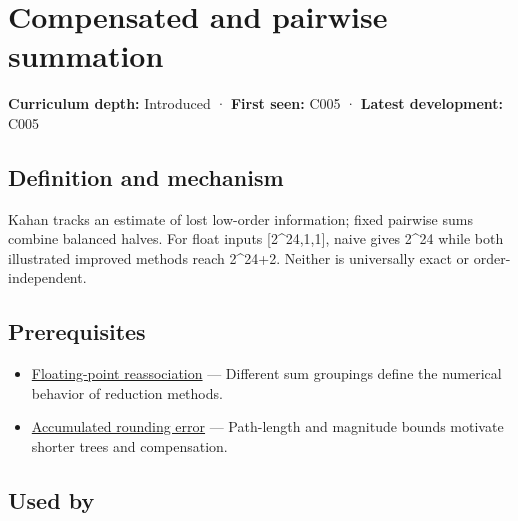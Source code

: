 \hypertarget{appendix-df318da57389}{}\label{referencestart:appendix-df318da57389}
\section{Compensated and pairwise summation}\label{appendix-df318da57389-compensated-and-pairwise-summation}

\hypertarget{appendix-df318da57389-compensated-and-pairwise-summation}{}

\textbf{Curriculum depth:} Introduced · \textbf{First seen:} C005 · \textbf{Latest development:} C005

\begin{allmightroledefinition}

\subsection{Definition and mechanism}\label{appendix-df318da57389-definition-and-mechanism}

\hypertarget{appendix-df318da57389-definition-and-mechanism}{}

Kahan tracks an estimate of lost low-order information; fixed pairwise sums combine balanced halves. For float inputs {[}2\^{}24,1,1{]}, naive gives 2\^{}24 while both illustrated improved methods reach 2\^{}24+2. Neither is universally exact or order-independent.

\end{allmightroledefinition}

\subsection{Prerequisites}\label{appendix-df318da57389-prerequisites}

\hypertarget{appendix-df318da57389-prerequisites}{}

\begin{itemize}
\tightlist
\item
  \hyperref[appendix-c2ac4a84c283]{Floating-point reassociation} --- Different sum groupings define the numerical behavior of reduction methods.
\item
  \hyperref[appendix-f82e270791c8]{Accumulated rounding error} --- Path-length and magnitude bounds motivate shorter trees and compensation.
\end{itemize}

\subsection{Used by}\label{appendix-df318da57389-used-by}

